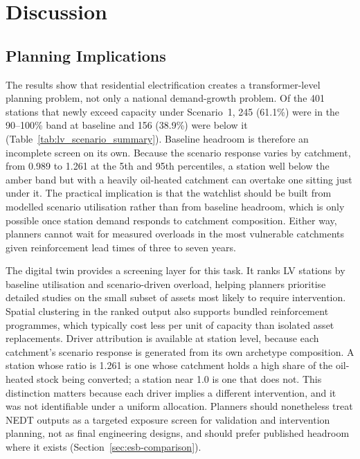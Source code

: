 \documentclass[preprint,12pt]{elsarticle}
\begin{document}
\section{Discussion}
\label{sec:discussion}

\subsection{Planning Implications}
\label{sec:planning}

The results show that residential electrification creates a
transformer-level planning problem, not only a national demand-growth
problem.
Of the 401 stations that newly exceed capacity under Scenario~1, 245
(61.1\%) were in the 90--100\% band at baseline and 156 (38.9\%) were below
it (Table~\ref{tab:lv_scenario_summary}).
Baseline headroom is therefore an incomplete screen on its own.
Because the scenario response varies by catchment, from 0.989 to 1.261 at the
5th and 95th percentiles, a station well below the amber band but with a
heavily oil-heated catchment can overtake one sitting just under it.
The practical implication is that the watchlist should be built from modelled
scenario utilisation rather than from baseline headroom, which is only
possible once station demand responds to catchment composition.
Either way, planners cannot wait for measured overloads in the most
vulnerable catchments given reinforcement lead times of three to seven
years.

The digital twin provides a screening layer for this task.
It ranks LV stations by baseline utilisation and scenario-driven
overload, helping planners prioritise detailed studies on the small subset
of assets most likely to require intervention.
Spatial clustering in the ranked output also supports bundled reinforcement
programmes, which typically cost less per unit of capacity than isolated
asset replacements.
Driver attribution is available at station level, because each catchment's
scenario response is generated from its own archetype composition. A station
whose ratio is 1.261 is one whose catchment holds a high share of the
oil-heated stock being converted; a station near 1.0 is one that does not.
This distinction matters because each driver implies a different
intervention, and it was not identifiable under a uniform allocation.
Planners should nonetheless treat NEDT outputs as a targeted exposure screen
for validation and intervention planning, not as final engineering designs,
and should prefer published headroom where it exists
(Section~\ref{sec:esb-comparison}).
\end{document}
